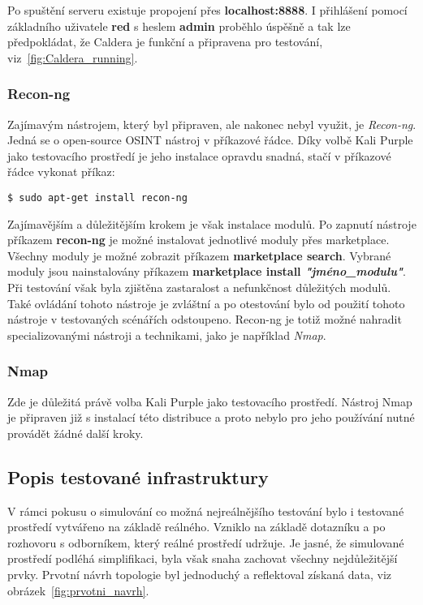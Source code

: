 
Po spuštění serveru existuje propojení přes \textbf{localhost:8888}.
I přihlášení pomocí základního uživatele \textbf{red} s heslem \textbf{admin} proběhlo úspěšně a tak lze předpokládat, že Caldera je funkční a připravena pro testování, viz~\ref{fig:Caldera_running}.


\subsubsection{Recon-ng}
Zajímavým nástrojem, který byl připraven, ale nakonec nebyl využit, je \textit{Recon-ng}.
Jedná se o open-source \ac{OSINT} nástroj v příkazové řádce.
Díky volbě Kali Purple jako testovacího prostředí je jeho instalace opravdu snadná, stačí v příkazové řádce vykonat příkaz:

\begin{codeblock}
	\begin{verbatim}
$ sudo apt-get install recon-ng
	\end{verbatim}
\end{codeblock}

Zajímavějším a důležitějším krokem je však instalace modulů.
Po zapnutí nástroje příkazem \textbf{recon-ng} je možné instalovat jednotlivé moduly přes marketplace.
Všechny moduly je možné zobrazit příkazem \textbf{marketplace search}.
Vybrané moduly jsou nainstalovány příkazem \textbf{marketplace install \textit{"jméno\_modulu"}}.
Při testování však byla zjištěna zastaralost a nefunkčnost důležitých modulů.
Také ovládání tohoto nástroje je zvláštní a po otestování bylo od použití tohoto nástroje v testovaných scénářích odstoupeno.
Recon-ng je totiž možné nahradit specializovanými nástroji a technikami, jako je například \textit{Nmap}.


\subsubsection{Nmap}
Zde je důležitá právě volba Kali Purple jako testovacího prostředí.
Nástroj Nmap je připraven již s instalací této distribuce a proto nebylo pro jeho používání nutné provádět žádné další kroky.


\subsection{Popis testované infrastruktury}\label{subsec:popis-testovane-infrastruktury}
V rámci pokusu o simulování co možná nejreálnějšího testování bylo i testované prostředí vytvářeno na základě reálného.
Vzniklo na základě dotazníku a po rozhovoru s odborníkem, který reálné prostředí udržuje.
Je jasné, že simulované prostředí podléhá simplifikaci, byla však snaha zachovat všechny nejdůležitější prvky.
Prvotní návrh topologie byl jednoduchý a reflektoval získaná data, viz obrázek~\ref{fig:prvotni_navrh}.

